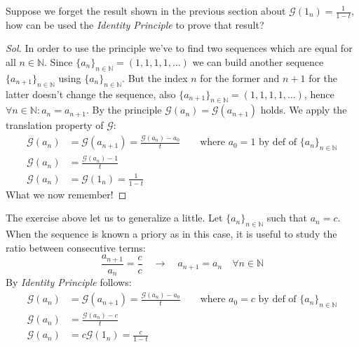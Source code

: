 \begin{exercise}
  Suppose we forget the result shown in the previous section about
  $\mathcal{G} (1_n) = \frac{1}{1-t} $, how can be used the
  \emph{Identity Principle} to prove that result?
\end{exercise}
\begin{proof}[Sol]
  In order to use the principle we've to find two sequences which are
  equal for all $n \in \mathbb{N} $. Since $\{a_n\}_{n\in\mathbb{N} }
  = (1,1,1,1,\ldots)$ we can build another sequence
  $\{a_{n+1}\}_{n\in\mathbb{N} } $ using $\{a_n\}_{n\in\mathbb{N} }
  $. But the index $n$ for the former and $n+1$ for the latter doesn't
  change the sequence, also $\{a_{n+1}\}_{n\in\mathbb{N} } =
  (1,1,1,1,\ldots)$, hence $\forall n\in \mathbb{N}: a_n =
  a_{n+1}$. By the principle $\mathcal{G} (a_n) = \mathcal{G}
  (a_{n+1})$ holds. We apply the translation property of $\mathcal{G}
  $:
  \begin{displaymath}
    \begin{split}
      \mathcal{G} (a_n) &= \mathcal{G} (a_{n+1}) = \frac{\mathcal{G}
        (a_n) - a_0}{t} \quad \quad \text{where } a_0 = 1 \text{ by def of }
      \{a_n\}_{n\in\mathbb{N} } \\
      \mathcal{G} (a_n) &= \frac{\mathcal{G}
        (a_n) -1}{t} \\
      \mathcal{G} (a_n) &= \mathcal{G} (1_n) = \frac{1}{1-t}
    \end{split}
  \end{displaymath}
  What we now remember!
\end{proof}

The exercise above let us to generalize a little. Let
$\{a_n\}_{n\in\mathbb{N} } $ such that $a_n = c$. When the sequence is
known a priory as in this case, it is useful to study the ratio
between consecutive terms:
\begin{displaymath}
   \frac{a_{n+1}}{a_n} =  \frac{c}{c} \quad \rightarrow \quad a_{n+1}
   = a_n \quad \forall n \in \mathbb{N} 
\end{displaymath}
By \emph{Identity Principle} follows:
\begin{displaymath}
  \begin{split}
    \mathcal{G} (a_n) &= \mathcal{G} (a_{n+1}) = \frac{\mathcal{G}
      (a_n) - a_0}{t} \quad \quad \text{where } a_0 = c \text{ by def
      of }
    \{a_n\}_{n\in\mathbb{N} } \\
    \mathcal{G} (a_n) &= \frac{\mathcal{G}
      (a_n) -c}{t} \\
    \mathcal{G} (a_n) &= c\mathcal{G} (1_n) = \frac{c}{1-t}
  \end{split}
\end{displaymath}

